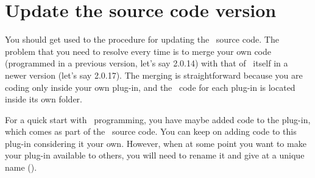 \section{Update the source code version}
You should get used to the procedure for updating the \US\ source code. The problem that you need to resolve every time is to merge your own code (programmed in a previous version, let's say 2.0.14) with that of \US\ itself in a newer version (let's say 2.0.17). The merging is straightforward because you are coding only inside your own plug-in, and the \CPP\ code for each plug-in is located inside its own folder.

For a quick start with \US\ programming, you have maybe added code to the  plug-in, which comes as part of the \US\ source code. You can keep on adding code to this plug-in considering it your own. However, when at some point you want to make your plug-in available to others, you will need to rename it and give at a unique name ().

